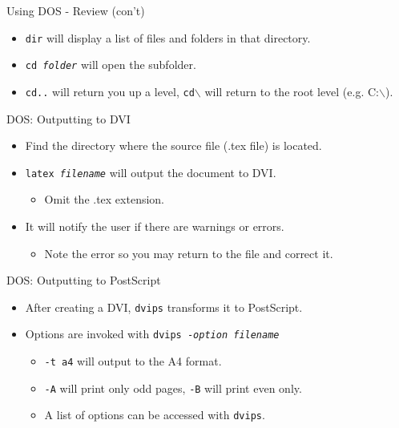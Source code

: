 \documentclass[pdf]{prosper}
\begin{document}
\begin{slide}{Using DOS - Review (con't)}
	\begin{itemize}
		\item \texttt{dir} will display a list of files and folders in that directory.
		\item \texttt{cd \textit{folder}} will open the subfolder.
		\item \texttt{cd..} will return you up a level, \texttt{cd$\backslash$} will return to the root level (e.g. C:$\backslash$).
	\end{itemize}
\end{slide}
\begin{slide}{DOS: Outputting to DVI}
	\begin{itemize}
		\item Find the directory where the source file (.tex file) is located.
		\item \texttt{latex \textit{filename}} will output the document to DVI.
			\begin{itemize}
				\item Omit the .tex extension.
			\end{itemize}
		\item It will notify the user if there are warnings or errors.
			\begin{itemize}
				\item Note the error so you may return to the file and correct it.
			\end{itemize}
	\end{itemize}
\end{slide}
\begin{slide}{DOS: Outputting to PostScript}
	\begin{itemize}
		\item After creating a DVI, \texttt{dvips} transforms it to PostScript.
		\item Options are invoked with \texttt{dvips -\textit{option filename}}
			\begin{itemize}
				\item \texttt{-t a4} will output to the A4 format.
				\item \texttt{-A} will print only odd pages, \texttt{-B} will print even only.
				\item A list of options can be accessed with \texttt{dvips}.
			\end{itemize}
	\end{itemize}
\end{slide}
\end{document}
